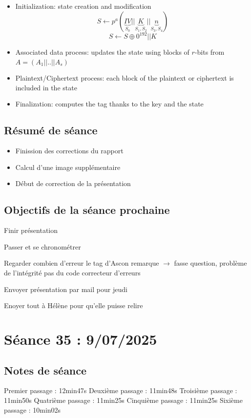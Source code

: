 \documentclass[12pt]{article}
\newcommand{\cmark}{\ding{51}}%
\newcommand{\done}{\rlap{$\square$}{\raisebox{2pt}{\large\hspace{1pt}\cmark}}%
	\hspace{-2.5pt}}
\begin{document}
	\begin{itemize}
		\item Initialization: state creation and modification
		$$S \leftarrow p^{a}( \underbrace{IV}_{S_0}||\underbrace{K}_{S_1,S_2}||\underbrace{n}_{S_3,S_4})$$
		$$S \leftarrow S \oplus 0^{192} || K$$
		\item Associated data process: updates the state using blocks of $r$-bits from $A=(A_1||..||A_s)$
		\item Plaintext/Ciphertext process: each block of the plaintext or ciphertext is included in the state
		\item Finalization: computes the tag thanks to the key and the state
	\end{itemize}	
	
	\subsection{Résumé de séance}
	\begin{itemize}
		\item Finission des corrections du rapport
		\item Calcul d'une image supplémentaire
		\item Début de correction de la présentation
	\end{itemize}
	
	\subsection{Objectifs de la séance prochaine}
	\begin{todolist}
		\item[\done] Finir présentation
		\item[\done] Passer et se chronométrer
		\item[\done] Regarder combien d'erreur le tag d'Ascon remarque $\rightarrow$ fasse question, problème de l'intégrité pas du code correcteur d'erreurs
		\item[\done] Envoyer présentation par mail pour jeudi
		\item[\done] Enoyer tout à Hélène pour qu'elle puisse relire
	\end{todolist}
	
	
	\section{Séance 35 : 9/07/2025}
	\subsection{Notes de séance}
	Premier passage : 12min47s
	Deuxième passage : 11min48s
	Troisième passage : 11min50s
	Quatrième passage : 11min25s
	Cinquième passage : 11min25s
	Sixième passage : 10min02s
	
\end{document}
